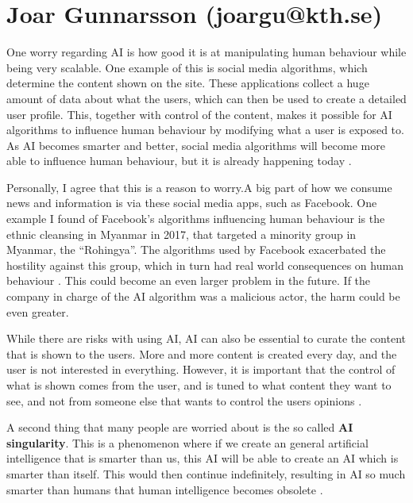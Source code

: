\documentclass[12pt]{article}
\begin{document}
\section{Joar Gunnarsson (joargu@kth.se)}
{
\setlength\parindent{0pt}   %
\setlength{\parskip}{\bigskipamount}    %
One worry regarding AI is how good it is at manipulating human behaviour while being very scalable. One example of this is social media algorithms, which determine the content shown on the site. These applications collect a huge amount of data about what the users, which can then be used to create a detailed user profile. This, together with control of the content, makes it possible for AI algorithms to influence human behaviour by modifying what a user is exposed to. As AI becomes smarter and better, social media algorithms will become more able to influence human behaviour, but it is already happening today \cite{AIWorries}.

Personally, I agree that this is a reason to worry.A big part of how we consume news and information is via these social media apps, such as Facebook. One example I found of Facebook's algorithms influencing human behaviour is the ethnic cleansing in Myanmar in 2017, that targeted a minority group in Myanmar, the ``Rohingya''. The algorithms used by Facebook exacerbated the hostility against this group, which in turn had real world consequences on human behaviour \cite{MyanmarCleansing}. This could become an even larger problem in the future. If the company in charge of the AI algorithm was a malicious actor, the harm could be even greater. 

While there are risks with using AI, AI can also be essential to curate the content that is shown to the users. More and more content is created every day, and the user is not interested in everything. However, it is important that the control of what is shown comes from the user, and is tuned to what content they want to see, and not from someone else that wants to control the users opinions \cite{AIWorries}.

A second thing that many people are worried about is the so called \textbf{AI singularity}. This is a phenomenon where if we create an general artificial intelligence that is smarter than us, this AI will be able to create an AI which is smarter than itself. This would then continue indefinitely, resulting in AI so much smarter than humans that human intelligence becomes obsolete \cite{IntelligenceExplosion}.

}
\end{document}
